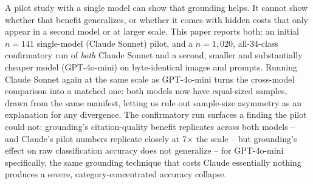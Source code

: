 \documentclass[10pt,twocolumn]{article}
\begin{document}
A pilot study with a single model can show that grounding helps. It cannot show whether that
benefit generalizes, or whether it comes with hidden costs that only appear in a second model or
at larger scale. This paper reports both: an initial $n=141$ single-model (Claude Sonnet) pilot,
and a $n=1{,}020$, all-34-class confirmatory run of \emph{both} Claude Sonnet and a second,
smaller and substantially cheaper model (GPT-4o-mini) on byte-identical images and prompts. Running
Claude Sonnet again at the same scale as GPT-4o-mini turns the cross-model comparison into a
matched one: both models now have equal-sized samples, drawn from the same manifest, letting us
rule out sample-size asymmetry as an explanation for any divergence. The confirmatory run surfaces
a finding the pilot could not: grounding's citation-quality benefit replicates across both models
-- and Claude's pilot numbers replicate closely at 7$\times$ the scale -- but grounding's effect
on raw classification accuracy does not generalize -- for GPT-4o-mini specifically, the same
grounding technique that costs Claude essentially nothing produces a severe, category-concentrated
accuracy collapse.
\end{document}
